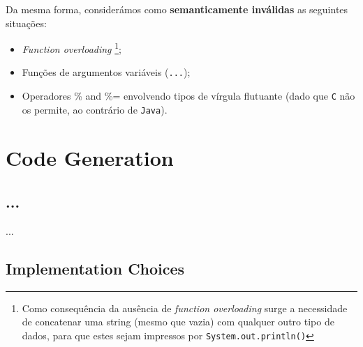\documentclass[a4paper]{article}
\begin{document}
Da mesma forma, considerámos como \textbf{semanticamente inválidas} as seguintes situações:
\begin{itemize}
	\item \textit{Function overloading} \footnote[1]{Como consequência da ausência de \textit{function overloading} surge a necessidade de concatenar
		uma string (mesmo que vazia) com qualquer outro tipo de dados, para que estes sejam impressos por \texttt{System.out.println()}};
	\item Funções de argumentos variáveis (\texttt{...});
	\item Operadores \% and \%= envolvendo tipos de vírgula flutuante (dado que \texttt{C} não os permite, ao contrário de \texttt{Java}).
\end{itemize}

\cleardoublepage

\section{Code Generation}
\subsection{...}
\indent \indent ...

\subsection{Implementation Choices}
\indent \indent %

\cleardoublepage
\end{document}
